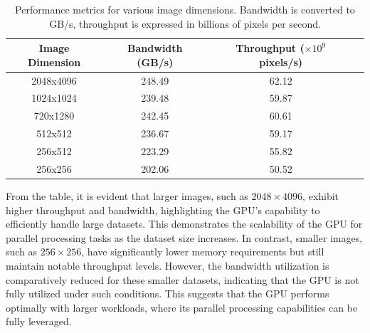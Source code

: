 \documentclass{article}
\begin{document}
\begin{table}[h!]
\centering
\renewcommand{\arraystretch}{1.3}
\begin{tabular}{|c|c|c|c|}
\hline
\textbf{Image Dimension} & \textbf{Bandwidth (GB/s)} & \textbf{Throughput (\( \times 10^9\) pixels/s)}  \\ \hline
2048x4096                & 248.49                     & 62.12                                            \\ \hline
1024x1024                & 239.48                     & 59.87                                            \\ \hline
720x1280                 & 242.45                     & 60.61                                            \\ \hline
512x512                  & 236.67                     & 59.17                                            \\ \hline
256x512                  & 223.29                     & 55.82                                            \\ \hline
256x256                  & 202.06                     & 50.52                                            \\ \hline

\end{tabular}
\caption{Performance metrics for various image dimensions. Bandwidth is converted to GB/s, throughput is expressed in billions of pixels per second.}
\label{tab:performance_metrics}
\end{table}

From the table, it is evident that larger images, such as \(2048 \times 4096\), exhibit higher throughput and bandwidth, highlighting the GPU's capability to efficiently handle large datasets. This demonstrates the scalability of the GPU for parallel processing tasks as the dataset size increases. In contrast, smaller images, such as \(256 \times 256\), have significantly lower memory requirements but still maintain notable throughput levels. However, the bandwidth utilization is comparatively reduced for these smaller datasets, indicating that the GPU is not fully utilized under such conditions. This suggests that the GPU performs optimally with larger workloads, where its parallel processing capabilities can be fully leveraged.
\end{document}
